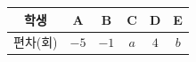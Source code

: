 {\renewcommand{\arraystretch}{1.35}\small
\begin{tabular}{|c|c|c|c|c|c|}
\hline
학생 & A & B & C & D & E \\ \hline
편차(회) & $-5$ & $-1$ & $a$ & $4$ & $b$ \\ \hline
\end{tabular}}
